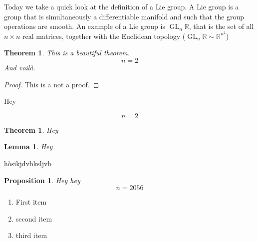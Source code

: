 \documentclass[a4paper, 12pt]{article}
\theoremstyle{definition}
\theoremstyle{plain}
\newtheorem{theorem}[definition]{Theorem}
\newtheorem{proposition}[definition]{Proposition}
\newtheorem{lemma}[definition]{Lemma}
\theoremstyle{remark}
\begin{document}
Today we take a quick look at the definition of a Lie group. A Lie group is a group that is simultaneously a differentiable manifold and such that the group operations are smooth. An example of a Lie group is \( \operatorname{GL}_n \mathbb{R} \), that is the set of all \( n \times n \) real matrices, together with the Euclidean topology (\( \operatorname{GL}_n \mathbb{R} \sim \mathbb{R}^{n^2} \))

\begin{theorem}
    This is a beautiful theorem.
    \begin{equation*}
        n = 2
    \end{equation*}
    And voilà.
\end{theorem}

\begin{proof}
    This is a not a proof.
\end{proof}

Hey

\begin{equation}
    n = 2
\end{equation}

\begin{theorem}
    Hey
\end{theorem}

\begin{lemma}
    Hey
\end{lemma}

hòsikjdvbksljvb

\begin{proposition}
    Hey hey
    \begin{equation}
        n = 2056
    \end{equation}
\end{proposition}

\begin{enumerate}
    \item First item
    \item second item
    \item third item
\end{enumerate}
\end{document}
